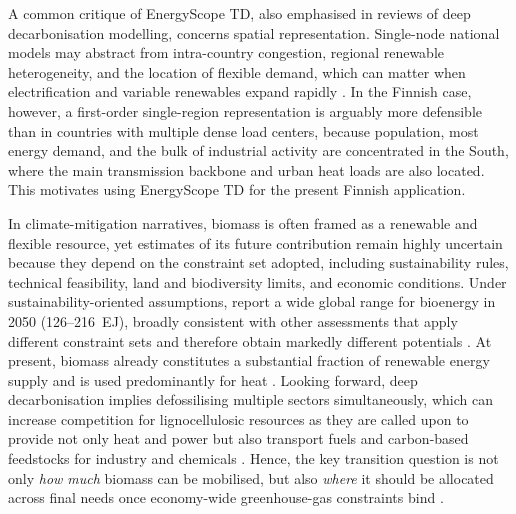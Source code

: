 \documentclass{article}
\begin{document}
A common critique of EnergyScope TD, also emphasised in reviews of deep decarbonisation modelling, concerns spatial representation. Single-node national models may abstract from intra-country congestion, regional renewable heterogeneity, and the location of flexible demand, which can matter when electrification and variable renewables expand rapidly \citep{borasioDeepDecarbonisationRegional2022,limpensEnergyScopePathwayOpensource2024}. In the Finnish case, however, a first-order single-region representation is arguably more defensible than in countries with multiple dense load centers, because population, most energy demand, and the bulk of industrial activity are concentrated in the South, where the main transmission backbone and urban heat loads are also located. This motivates using EnergyScope TD for the present Finnish application.


In climate-mitigation narratives, biomass is often framed as a renewable and flexible resource, yet estimates of its future contribution remain highly uncertain because they depend on the constraint set adopted, including sustainability rules, technical feasibility, land and biodiversity limits, and economic conditions. Under sustainability-oriented assumptions, \citet{beringerBioenergyProductionPotential2011} report a wide global range for bioenergy in 2050 (126--216~EJ), broadly consistent with other assessments that apply different constraint sets and therefore obtain markedly different potentials \citep{haberlGlobalTechnicalPotential2010,schuelerGlobalBiomassPotentials2013,searleReassessmentGlobalBioenergy2015,ieaBioenergyAnnualReport2023}. At present, biomass already constitutes a substantial fraction of renewable energy supply and is used predominantly for heat \citep{ieaKeyWorldEnergy2020,ieaBioenergyAnnualReport2023}. Looking forward, deep decarbonisation implies defossilising multiple sectors simultaneously, which can increase competition for lignocellulosic resources as they are called upon to provide not only heat and power but also transport fuels and carbon-based feedstocks for industry and chemicals \citep{daioglouCompetingUsesBiomass2015}. Hence, the key transition question is not only \emph{how much} biomass can be mobilised, but also \emph{where} it should be allocated across final needs once economy-wide greenhouse-gas constraints bind \citep{collaOptimalUseLignocellulosic2022}.
\end{document}
